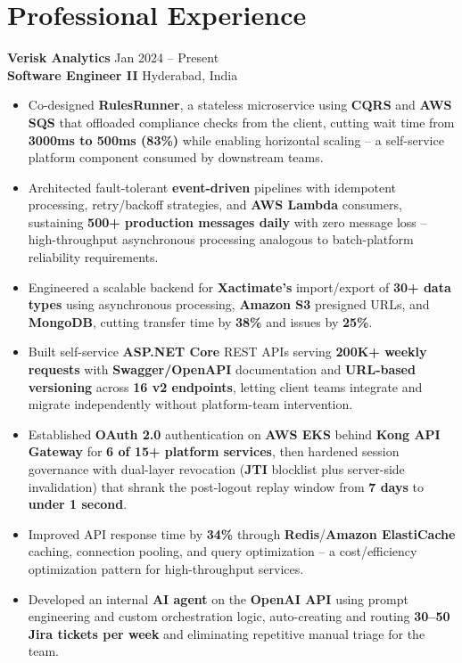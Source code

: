 \documentclass[a4paper,10pt]{article}
\begin{document}
\section*{Professional Experience}

\textbf{Verisk Analytics} \hfill Jan 2024 -- Present \\
\textbf{Software Engineer II} \hfill Hyderabad, India

\begin{itemize}[leftmargin=*]
    \item Co-designed \textbf{RulesRunner}, a stateless microservice using \textbf{CQRS} and \textbf{AWS SQS} that offloaded compliance checks from the client, cutting wait time from \textbf{3000ms to 500ms (83\%)} while enabling horizontal scaling -- a self-service platform component consumed by downstream teams.
    \item Architected fault-tolerant \textbf{event-driven} pipelines with idempotent processing, retry/backoff strategies, and \textbf{AWS Lambda} consumers, sustaining \textbf{500+ production messages daily} with zero message loss -- high-throughput asynchronous processing analogous to batch-platform reliability requirements.
    \item Engineered a scalable backend for \textbf{Xactimate's} import/export of \textbf{30+ data types} using asynchronous processing, \textbf{Amazon S3} presigned URLs, and \textbf{MongoDB}, cutting transfer time by \textbf{38\%} and issues by \textbf{25\%}.
    \item Built self-service \textbf{ASP.NET Core} REST APIs serving \textbf{200K+ weekly requests} with \textbf{Swagger/OpenAPI} documentation and \textbf{URL-based versioning} across \textbf{16 v2 endpoints}, letting client teams integrate and migrate independently without platform-team intervention.
    \item Established \textbf{OAuth 2.0} authentication on \textbf{AWS EKS} behind \textbf{Kong API Gateway} for \textbf{6 of 15+ platform services}, then hardened session governance with dual-layer revocation (\textbf{JTI} blocklist plus server-side invalidation) that shrank the post-logout replay window from \textbf{7 days} to \textbf{under 1 second}.
    \item Improved API response time by \textbf{34\%} through \textbf{Redis}/\textbf{Amazon ElastiCache} caching, connection pooling, and query optimization -- a cost/efficiency optimization pattern for high-throughput services.
    \item Developed an internal \textbf{AI agent} on the \textbf{OpenAI API} using prompt engineering and custom orchestration logic, auto-creating and routing \textbf{30--50 Jira tickets per week} and eliminating repetitive manual triage for the team.

\end{itemize}
\end{document}
